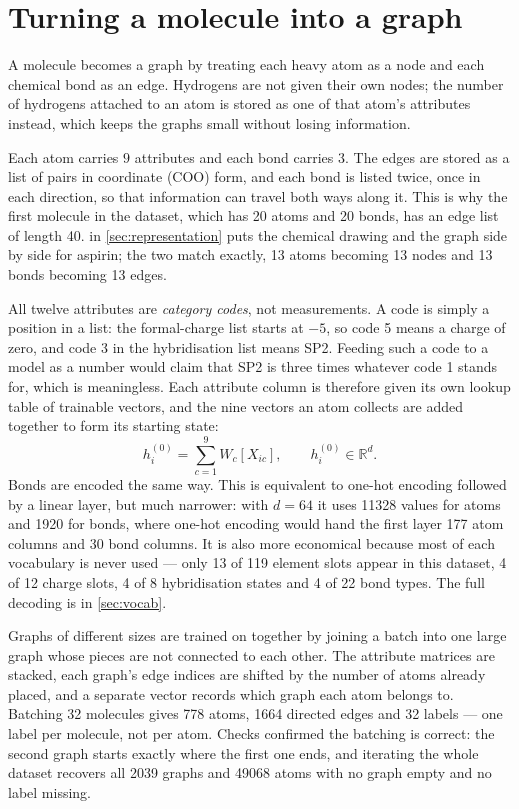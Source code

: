 \section{Turning a molecule into a graph}
\label{part:graph}

A molecule becomes a graph by treating each heavy atom as a node and each chemical bond as an edge. Hydrogens are not given their own nodes; the number of hydrogens attached to an atom is stored as one of that atom's attributes instead, which keeps the graphs small without losing information.

Each atom carries $9$ attributes and each bond carries $3$. The edges are stored as a list of pairs in coordinate (COO) form, and each bond is listed twice, once in each direction, so that information can travel both ways along it. This is why the first molecule in the dataset, which has 20 atoms and 20 bonds, has an edge list of length 40.  in \ref{sec:representation} puts the chemical drawing and the graph side by side for aspirin; the two match exactly, 13 atoms becoming 13 nodes and 13 bonds becoming 13 edges.

All twelve attributes are \emph{category codes}, not measurements. A code is simply a position in a list: the formal-charge list starts at $-5$, so code 5 means a charge of zero, and code 3 in the hybridisation list means SP2. Feeding such a code to a model as a number would claim that SP2 is three times whatever code 1 stands for, which is meaningless. Each attribute column is therefore given its own lookup table of trainable vectors, and the nine vectors an atom collects are added together to form its starting state:
\begin{equation}
    h_i^{(0)} = \sum_{c=1}^{9} W_c\!\left[X_{ic}\right], \qquad h_i^{(0)} \in \mathbb{R}^{d}.
    \label{eq:atom-encoder}
\end{equation}
Bonds are encoded the same way. This is equivalent to one-hot encoding followed by a linear layer, but much narrower: with $d = 64$ it uses \num{11328} values for atoms and \num{1920} for bonds, where one-hot encoding would hand the first layer 177 atom columns and 30 bond columns. It is also more economical because most of each vocabulary is never used --- only 13 of 119 element slots appear in this dataset, 4 of 12 charge slots, 4 of 8 hybridisation states and 4 of 22 bond types. The full decoding is in \ref{sec:vocab}.

Graphs of different sizes are trained on together by joining a batch into one large graph whose pieces are not connected to each other. The attribute matrices are stacked, each graph's edge indices are shifted by the number of atoms already placed, and a separate vector records which graph each atom belongs to. Batching 32 molecules gives 778 atoms, 1664 directed edges and 32 labels --- one label per molecule, not per atom. Checks confirmed the batching is correct: the second graph starts exactly where the first one ends, and iterating the whole dataset recovers all 2039 graphs and \num{49068} atoms with no graph empty and no label missing.

